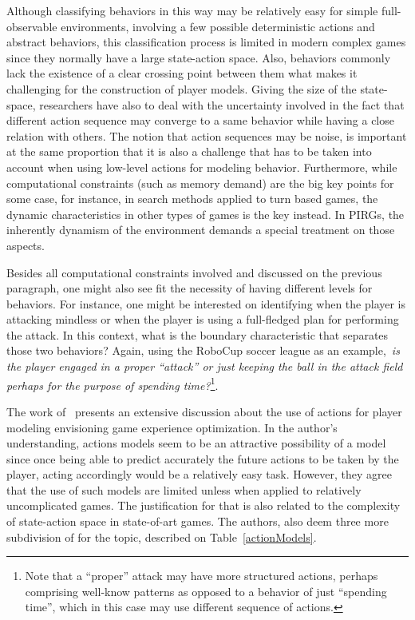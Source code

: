 Although classifying behaviors in this way may be relatively easy for simple full-observable environments, involving a few possible deterministic actions and abstract behaviors, this classification process is limited in modern complex games since they normally have a large state-action space. Also, behaviors commonly lack the existence of a clear crossing point between them what makes it challenging for the construction of player models. Giving the size of the state-space, researchers have also to deal with the uncertainty involved in the fact that different action sequence may converge to a same behavior while having a close relation with others. The notion that action sequences may be noise, is important at the same proportion that it is also a challenge that has to be taken into account when using low-level actions for modeling behavior.  Furthermore, while computational constraints (such as memory demand) are the big key points for some case, for instance, in search methods applied to turn based games, the dynamic characteristics in other types of games is the key instead. In PIRGs, the inherently dynamism of the environment demands a special treatment on those aspects.

Besides all computational constraints involved and discussed on the previous paragraph, one might also see fit the necessity of having different levels for behaviors. For instance, one might be interested on identifying when the player is attacking mindless or when the player is using a full-fledged plan for performing the attack. In this context, what is the boundary characteristic that separates those two behaviors? Again, using the RoboCup soccer league as an example,~\textit{is the player engaged in a proper ``attack'' or just keeping the ball in the attack field perhaps for the purpose of spending time?}\footnote{Note that a ``proper'' attack may have more structured actions, perhaps comprising well-know patterns as opposed to a behavior of just ``spending time'', which in this case may use different sequence of actions.}.

The work of~\cite{bakkes_player_2012} presents an extensive discussion about the use of actions for player modeling envisioning game experience optimization. In the author's understanding, actions models seem to be an attractive possibility of a model since once being able to predict accurately the future actions to be taken by the player, acting accordingly would be a relatively easy task. However, they agree that the use of such models are limited unless when applied to relatively uncomplicated games. The justification for that is also related to the complexity of state-action space in state-of-art games. The authors, also deem three more subdivision of for the topic, described on Table~\ref{actionModels}.

